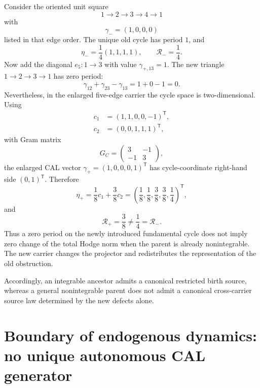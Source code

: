\documentclass[aip,jmp,amsmath,amssymb,reprint]{revtex4-2}
\newcommand{\Rcal}{\mathcal{R}}
\begin{document}
Consider the oriented unit square
\begin{equation}
1\to2\to3\to4\to1
\end{equation}
with
\begin{equation}
\gamma_-=(1,0,0,0)
\end{equation}
listed in that edge order. The unique old cycle has period $1$, and
\begin{equation}
\eta_-=\frac14(1,1,1,1),
\qquad
\Rcal_-=\frac14.
\label{eq:square-old-R}
\end{equation}
Now add the diagonal $e_5:1\to3$ with value $\gamma_{+,13}=1$. The new triangle $1\to2\to3\to1$ has zero period:
\begin{equation}
\gamma_{12}+\gamma_{23}-\gamma_{13}=1+0-1=0.
\label{eq:zero-new-period}
\end{equation}
Nevertheless, in the enlarged five-edge carrier the cycle space is two-dimensional. Using
\begin{align}
c_1&=(1,1,0,0,-1)^{\mathsf T},\\
c_2&=(0,0,1,1,1)^{\mathsf T},
\end{align}
with Gram matrix
\begin{equation}
G_C=\begin{pmatrix}3&-1\\-1&3\end{pmatrix},
\end{equation}
the enlarged CAL vector $\gamma_+=(1,0,0,0,1)^{\mathsf T}$ has cycle-coordinate right-hand side $(0,1)^{\mathsf T}$. Therefore
\begin{equation}
\eta_+
=\frac18c_1+\frac38c_2
=\left(\frac18,\frac18,\frac38,\frac38,\frac14\right)^{\mathsf T},
\end{equation}
and
\begin{equation}
\Rcal_+=\frac38\neq\frac14=\Rcal_-.
\label{eq:zero-defect-R-change}
\end{equation}
Thus a zero period on the newly introduced fundamental cycle does not imply zero change of the total Hodge norm when the parent is already nonintegrable. The new carrier changes the projector and redistributes the representation of the old obstruction.

Accordingly, an integrable ancestor admits a canonical restricted birth source, whereas a general nonintegrable parent does not admit a canonical cross-carrier source law determined by the new defects alone.

\section{Boundary of endogenous dynamics: no unique autonomous CAL generator}\label{sec:stop}
\end{document}
